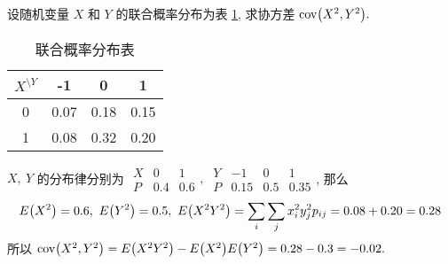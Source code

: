 \begin{example}[2002 数三]
    设随机变量 $X$ 和 $Y$ 的联合概率分布为表 \ref{-101007018015}, 求协方差 $\mathrm{cov}\qty(X^2,Y^2).$
\end{example}
\begin{solution}
    \begin{minipage}{0.3\linewidth}
        \begin{table}[H]
            \centering
            \caption*{联合概率分布表}
            \label{-101007018015}
            \begin{tabular}{c | c c c}
                $X^{\displaystyle\setminus Y}$ & -1   & 0    & 1    \\
                \midrule
                0                              & 0.07 & 0.18 & 0.15 \\
                1                              & 0.08 & 0.32 & 0.20
            \end{tabular}
        \end{table}
    \end{minipage}\hfill
    \begin{minipage}{0.66\linewidth}
        $X,~Y$ 的分布律分别为 $\begin{array}{c|cc}
                X & 0   & 1   \\\hline
                P & 0.4 & 0.6
            \end{array},~\begin{array}{c|ccc}
                Y & -1   & 0   & 1    \\\hline
                P & 0.15 & 0.5 & 0.35
            \end{array}$, 那么
        $$E\qty(X^2)=0.6,~E\qty(Y^2)=0.5,~E\qty(X^2Y^2)=\sum_i\sum_j x_i^2y_j^2 p_{ij}=0.08+0.20=0.28$$
        所以 $\mathrm{cov}\qty(X^2,Y^2)=E\qty(X^2Y^2)-E\qty(X^2)E\qty(Y^2)=0.28-0.3=-0.02.$
    \end{minipage}
\end{solution}

